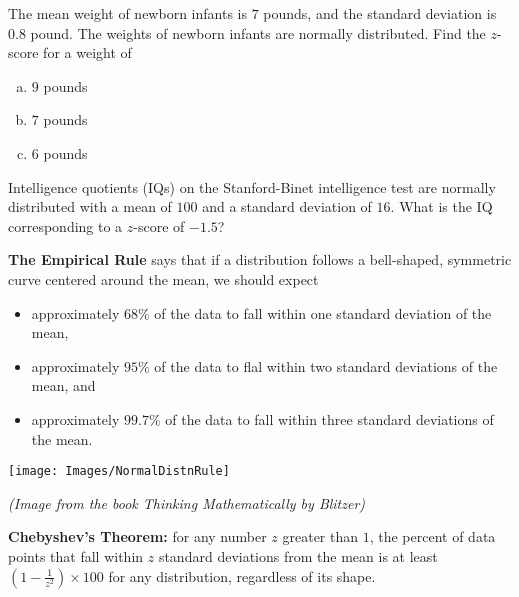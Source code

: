 \documentclass[12pt, letterpaper]{article}
\newcounter{exercise}
\theoremstyle{definition}
\begin{document}
\begin{exercise}
The mean weight of newborn infants is $7$ pounds, and the standard deviation is $0.8$ pound.  The weights of newborn infants are normally distributed.  Find the $z$-score for a weight of 
\begin{enumerate}[(a)]
\item $9$ pounds
\item $7$ pounds
\item $6$ pounds
\end{enumerate}

\end{exercise}

\vfill

\begin{exercise}  

Intelligence quotients (IQs) on the Stanford-Binet intelligence test are normally distributed with a mean of $100$ and a standard deviation of $16$.  What is the IQ corresponding to a $z$-score of $-1.5$?

\end{exercise}

\vfill

\newpage


\begin{statement}

\textbf{The Empirical Rule} says that if a distribution follows a bell-shaped, symmetric curve centered around the mean, we should expect 
\begin{itemize}
\item approximately $68\%$ of the data to fall within one standard deviation of the mean,
\item approximately $95\%$ of the data to flal within two standard deviations of the mean, and
\item approximately $99.7\%$ of the data to fall within three standard deviations of the mean.
\end{itemize}

\begin{center}
\texttt{[image: Images/NormalDistnRule]}

\textit{(Image from the book \textit{Thinking Mathematically} by Blitzer)}

\end{center}

\end{statement}

\begin{theorem}
\textbf{Chebyshev's Theorem:}  for any number $z$ greater than $1$, the percent of data points that fall within $z$ standard deviations from the mean is at least $\left( 1-\frac{1}{z^2}\right)\times 100$ for any distribution, regardless of its shape.
\end{theorem}
\end{document}
